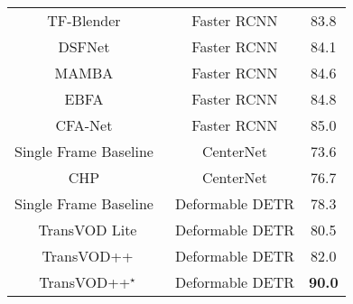 \documentclass[10pt,journal,compsoc]{IEEEtran}
\begin{document}
\begin{table}[t!]
\begin{center}
\begin{tabular}{c|c|c}
TF-Blender~\cite{Cui_2021_ICCV} & Faster RCNN  & 83.8\\
DSFNet~\cite{lin2020dual} & Faster RCNN  & 84.1\\
MAMBA~\cite{sun2021mamba} & Faster RCNN  & 84.6\\
EBFA~\cite{han2020exploiting} & Faster RCNN  & 84.8\\
CFA-Net~\cite{han2021cfanet} & Faster RCNN  & 85.0\\
\midrule
Single Frame Baseline~\cite{zhou2019objects}  & CenterNet  &73.6\\ CHP~\cite{xu2020centernet} &  CenterNet &76.7\\ \midrule
Single Frame Baseline~\cite{zhu2020deformable} &  Deformable DETR & 78.3 \\
TransVOD Lite &Deformable DETR & 80.5 \\
TransVOD++ &Deformable DETR & 82.0 \\
TransVOD++$^{\star}$ &Deformable DETR & \textbf{90.0} \\
\bottomrule
\end{tabular}
\end{center}
\label{table:mainresult_r101}
\vspace{-5mm}
\end{table}
\end{document}
